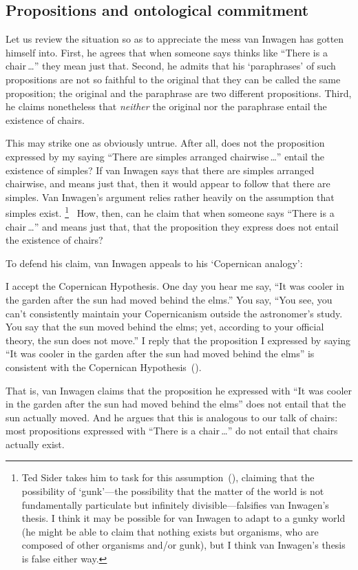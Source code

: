\documentclass[11pt]{article}
\newenvironment{squote}{%
	\begin{spacing}{1}
	\begin{list}{}{%
	\setlength{\labelwidth}{0pt}%
	\rightmargin\leftmargin%
	}
	\item\relax
	}{%
	\end{list}%
	\end{spacing}
	}
\begin{document}
\begin{spacing}{1.5}
\subsection{Propositions and ontological commitment}
Let us review the situation so as to appreciate the mess van Inwagen has gotten himself into. First, he agrees that when someone says thinks like ``There is a chair\,\ldots '' they mean just that. Second, he admits that his `paraphrases' of such propositions are not so faithful to the original that they can be called the same proposition; the original and the paraphrase are two different propositions. Third, he claims nonetheless that {\em neither} the original nor the paraphrase entail the existence of chairs.

This may strike one as obviously untrue. After all, does not the proposition expressed by my saying ``There are simples arranged chairwise\,\ldots '' entail the existence of simples? If van Inwagen says that there are simples arranged chairwise, and means just that, then it would appear to follow that there are simples. Van Inwagen's argument relies rather heavily on the assumption that simples exist.%
%
\footnote{Ted Sider takes him to task for this assumption~(\citeyear{sider1993}), claiming that the possibility of `gunk'---the possibility that the matter of the world is not fundamentally particulate but infinitely divisible---falsifies van Inwagen's thesis. I think it may be possible for van Inwagen to adapt to a gunky world (he might be able to claim that nothing exists but organisms, who are composed of other organisms and/or gunk), but I think van Inwagen's thesis is false either way.}
%
\ How, then, can he claim that when someone says ``There is a chair\,\ldots '' and means just that, that the proposition they express does not entail the existence of chairs?

To defend his claim, van Inwagen appeals to his `Copernican analogy':
\begin{squote}
I accept the Copernican Hypothesis. One day you hear me say, ``It was cooler in the garden after the sun had moved behind the elms.'' You say, ``You see, you can't consistently maintain your Copernicanism outside the astronomer's study. You say that the sun moved behind the elms; yet, according to your official theory, the sun does not move.'' I reply that the proposition I expressed by saying ``It was cooler in the garden after the sun had moved behind the elms'' is consistent with the Copernican Hypothesis~(\citeyear[101]{inwagen1995}).
\end{squote}
That is, van Inwagen claims that the proposition he expressed with ``It was cooler in the garden after the sun had moved behind the elms'' does not entail that the sun actually moved. And he argues that this is analogous to our talk of chairs: most propositions expressed with ``There is a chair\,\ldots '' do not entail that chairs actually exist.


\end{spacing}
\end{document}
